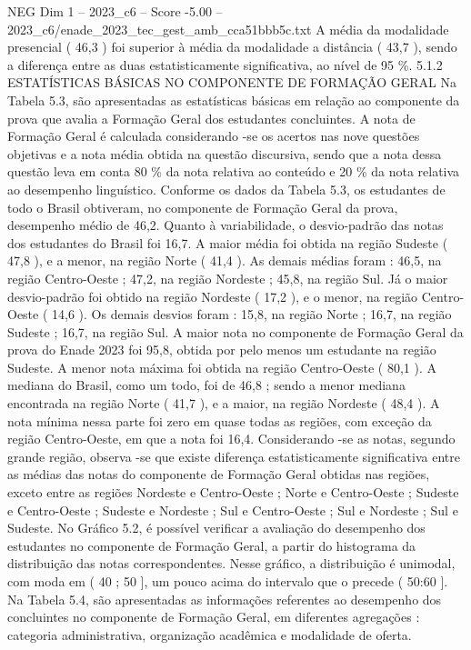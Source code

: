 \begin{textsample}{NEG Dim 1 – 2023\_c6 – Score -5.00 – 2023\_c6/enade\_2023\_tec\_gest\_amb\_cca51bbb5c.txt}
A média da modalidade presencial ( 46,3 ) foi superior à média da modalidade a distância ( 43,7 ), sendo a diferença entre as duas estatisticamente significativa, ao nível de 95 \%. 5.1.2 ESTATÍSTICAS BÁSICAS NO COMPONENTE DE FORMAÇÃO GERAL Na Tabela 5.3, são apresentadas as estatísticas básicas em relação ao componente da prova que avalia a Formação Geral dos estudantes concluintes.
A nota de Formação Geral é calculada considerando -se os acertos nas nove questões objetivas e a nota média obtida na questão discursiva, sendo que a nota dessa questão leva em conta 80 \% da nota relativa ao conteúdo e 20 \% da nota relativa ao desempenho linguístico.
Conforme os dados da Tabela 5.3, os estudantes de todo o Brasil obtiveram, no componente de Formação Geral da prova, desempenho médio de 46,2.
Quanto à variabilidade, o desvio-padrão das notas dos estudantes do Brasil foi 16,7.
A maior média foi obtida na região Sudeste ( 47,8 ), e a menor, na região Norte ( 41,4 ).
As demais médias foram : 46,5, na região Centro-Oeste ; 47,2, na região Nordeste ; 45,8, na região Sul.
Já o maior desvio-padrão foi obtido na região Nordeste ( 17,2 ), e o menor, na região Centro-Oeste ( 14,6 ).
Os demais desvios foram : 15,8, na região Norte ; 16,7, na região Sudeste ; 16,7, na região Sul.
A maior nota no componente de Formação Geral da prova do Enade 2023 foi 95,8, obtida por pelo menos um estudante na região Sudeste.
A menor nota máxima foi obtida na região Centro-Oeste ( 80,1 ).
A mediana do Brasil, como um todo, foi de 46,8 ; sendo a menor mediana encontrada na região Norte ( 41,7 ), e a maior, na região Nordeste ( 48,4 ).
A nota mínima nessa parte foi zero em quase todas as regiões, com exceção da região Centro-Oeste, em que a nota foi 16,4.
Considerando -se as notas, segundo grande região, observa -se que existe diferença estatisticamente significativa entre as médias das notas do componente de Formação Geral obtidas nas regiões, exceto entre as regiões Nordeste e Centro-Oeste ; Norte e Centro-Oeste ; Sudeste e Centro-Oeste ; Sudeste e Nordeste ; Sul e Centro-Oeste ; Sul e Nordeste ; Sul e Sudeste.
No Gráfico 5.2, é possível verificar a avaliação do desempenho dos estudantes no componente de Formação Geral, a partir do histograma da distribuição das notas correspondentes.
Nesse gráfico, a distribuição é unimodal, com moda em ( 40 ; 50 ], um pouco acima do intervalo que o precede ( 50:60 ].
Na Tabela 5.4, são apresentadas as informações referentes ao desempenho dos concluintes no componente de Formação Geral, em diferentes agregações : categoria administrativa, organização acadêmica e modalidade de oferta.

\end{textsample}
